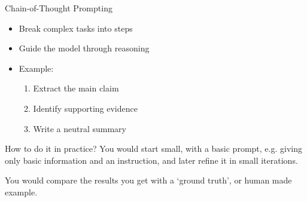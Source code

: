 \documentclass{beamer}
\begin{document}
\begin{frame}{Chain-of-Thought Prompting}
\begin{itemize}
    \item Break complex tasks into steps
    \item Guide the model through reasoning
    \item Example:
    \begin{enumerate}
        \item Extract the main claim
        \item Identify supporting evidence
        \item Write a neutral summary
    \end{enumerate}
\end{itemize}
\end{frame}

\begin{frame}{How to do it in practice?}
    You would start small, with a basic prompt, e.g. giving only basic information and an instruction, and later refine it in small iterations.

    You would compare the results you get with a `ground truth', or human made example.
\end{frame}
\end{document}
